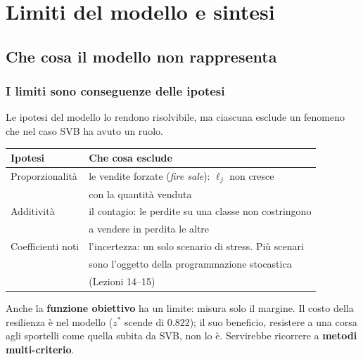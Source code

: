 

\section{Limiti del modello e sintesi}



\subsection{Che cosa il modello non rappresenta}%

\begin{frame}%
%

\frametitle{I limiti sono conseguenze delle ipotesi}%
%

%


Le ipotesi del modello lo rendono risolvibile, ma ciascuna esclude un fenomeno
che nel caso SVB ha avuto un ruolo.

\begin{center}
{\small
\begin{tabular}
[c]{ll}\hline
\textbf{Ipotesi} & \textbf{Che cosa esclude}\\\hline
Proporzionalit\`{a} & le vendite forzate (\emph{fire sale}): $\ell_{j}$ non
cresce\\
& con la quantit\`{a} venduta\\[3pt]%
Additivit\`{a} & il contagio: le perdite su una classe non costringono\\
& a vendere in perdita le altre\\[3pt]%
Coefficienti noti & l'incertezza: un solo scenario di stress. Pi\`{u}
scenari\\
& sono l'oggetto della programmazione stocastica\\
& (Lezioni 14--15)\\\hline
\end{tabular}
}
\end{center}

\begin{stepitemize}
\item Anche la \textbf{funzione obiettivo} ha un limite: misura solo il
margine. Il costo della resilienza \`{e} nel modello ($z^{\ast}$ scende di
$0.822$); il suo beneficio, resistere a una corsa agli sportelli come quella
subita da SVB, non lo \`{e}. Servirebbe ricorrere a \textbf{metodi
multi-criterio}.
\end{stepitemize}

%

\transboxout
\end{frame}%


